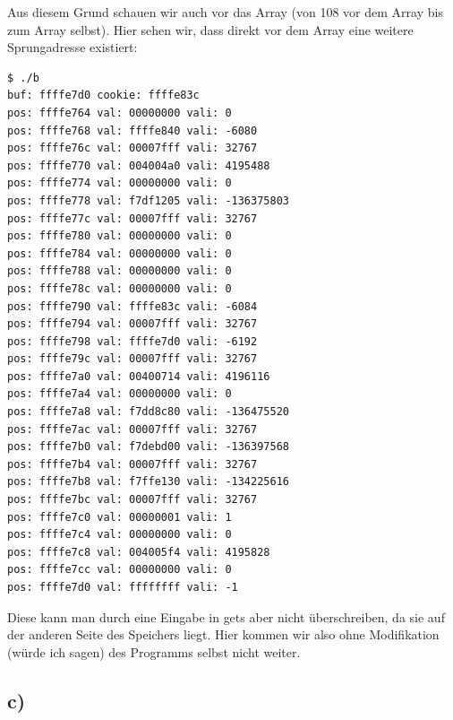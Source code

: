 \documentclass[10pt,a4paper]{article}
\begin{document}
Aus diesem Grund schauen wir auch vor das Array (von 108 vor dem Array bis zum Array selbst). Hier sehen wir, dass direkt vor dem Array eine weitere Sprungadresse existiert:
\begin{verbatim}
$ ./b
buf: ffffe7d0 cookie: ffffe83c
pos: ffffe764 val: 00000000 vali: 0
pos: ffffe768 val: ffffe840 vali: -6080
pos: ffffe76c val: 00007fff vali: 32767
pos: ffffe770 val: 004004a0 vali: 4195488
pos: ffffe774 val: 00000000 vali: 0
pos: ffffe778 val: f7df1205 vali: -136375803
pos: ffffe77c val: 00007fff vali: 32767
pos: ffffe780 val: 00000000 vali: 0
pos: ffffe784 val: 00000000 vali: 0
pos: ffffe788 val: 00000000 vali: 0
pos: ffffe78c val: 00000000 vali: 0
pos: ffffe790 val: ffffe83c vali: -6084
pos: ffffe794 val: 00007fff vali: 32767
pos: ffffe798 val: ffffe7d0 vali: -6192
pos: ffffe79c val: 00007fff vali: 32767
pos: ffffe7a0 val: 00400714 vali: 4196116
pos: ffffe7a4 val: 00000000 vali: 0
pos: ffffe7a8 val: f7dd8c80 vali: -136475520
pos: ffffe7ac val: 00007fff vali: 32767
pos: ffffe7b0 val: f7debd00 vali: -136397568
pos: ffffe7b4 val: 00007fff vali: 32767
pos: ffffe7b8 val: f7ffe130 vali: -134225616
pos: ffffe7bc val: 00007fff vali: 32767
pos: ffffe7c0 val: 00000001 vali: 1
pos: ffffe7c4 val: 00000000 vali: 0
pos: ffffe7c8 val: 004005f4 vali: 4195828
pos: ffffe7cc val: 00000000 vali: 0
pos: ffffe7d0 val: ffffffff vali: -1
\end{verbatim}

Diese kann man durch eine Eingabe in gets aber nicht überschreiben, da sie auf der anderen Seite des Speichers liegt. Hier kommen wir also ohne Modifikation (würde ich sagen) des Programms selbst nicht weiter.

\subsection*{c)}
\end{document}
